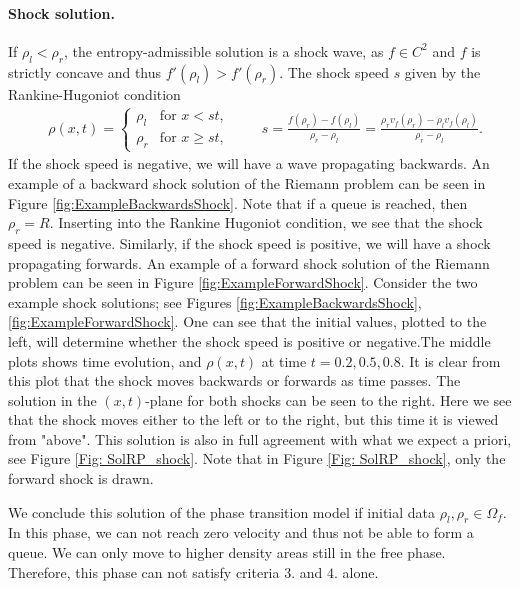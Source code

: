 \documentclass[10pt]{article}
\numberwithin{equation}{section}
\begin{document}
\paragraph{Shock solution.} If $\rho_l < \rho_r$, the entropy-admissible solution is a shock wave, as $f \in C^2$ and $f$ is strictly concave and thus $f'(\rho_l) > f'(\rho_r) $. The shock speed $s$ given by the Rankine-Hugoniot condition
\begin{align*}
    & \rho(x,t) = \begin{cases}
    \rho_l & \text{for $x < st$, } \\
    \rho_r & \text{for $x \geq st$, }
    \end{cases} 
    \quad \quad s = \frac{f(\rho_r) - f(\rho_l)}{\rho_r - \rho_l} = \frac{\rho_r v_f(\rho_r) -\rho_l v_f(\rho_l)}{\rho_r - \rho_l}.
\end{align*}
If the shock speed is negative, we will have a wave propagating backwards. An example of a backward shock solution of the Riemann problem can be seen in Figure \ref{fig:ExampleBackwardsShock}. Note that if a queue is reached, then $\rho_r = R$. Inserting into the Rankine Hugoniot condition, we see that the shock speed is negative. Similarly, if the shock speed is positive, we will have a shock propagating forwards. An example of a forward shock solution of the Riemann problem can be seen in Figure \ref{fig:ExampleForwardShock}.
Consider the two example shock solutions; see Figures \ref{fig:ExampleBackwardsShock}, \ref{fig:ExampleForwardShock}. One can see that the initial values, plotted to the left, will determine whether the shock speed is positive or negative.The middle plots shows time evolution, and $\rho(x,t)$ at time $t = 0.2, 0.5, 0.8$. It is clear from this plot that the shock moves backwards or forwards as time passes. The solution in the $(x,t)$-plane for both shocks can be seen to the right. Here we see that the shock moves either to the left or to the right, but this time it is viewed from "above". This solution is also in full agreement with what we expect a priori, see Figure \ref{Fig: SolRP_shock}. Note that in Figure \ref{Fig: SolRP_shock}, only the forward shock is drawn. 

We conclude this solution of the phase transition model if initial data $\rho_l, \rho_r \in \Omega_f$. In this phase, we can not reach zero velocity and thus not be able to form a queue. We can only move to higher density areas still in the free phase. Therefore, this phase can not satisfy criteria $3.$ and $4.$ alone.  
\end{document}
